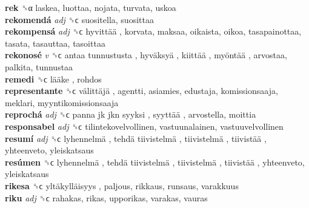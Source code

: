 \textbf{rek} ␝α  laskea, luottaa, nojata, turvata, uskoa  \\
\textbf{rekomendá} \emph{adj}  ␝ϲ  suositella, suosittaa  \\
\textbf{rekompensá} \emph{adj}  ␝ϲ   hyvittää , korvata, maksaa, oikaista, oikoa, tasapainottaa, tasata, tasauttaa, tasoittaa  \\
\textbf{rekonosé} \emph{v}  ␝ϲ   antaa tunnustusta ,  hyväksyä ,  kiittää ,  myöntää , arvostaa, palkita, tunnustaa  \\
\textbf{remedi} ␝ϲ   lääke , rohdos  \\
\textbf{representante} ␝ϲ   välittäjä , agentti, asiamies, edustaja, komissionsaaja, meklari, myyntikomissionsaaja  \\
\textbf{reprochá} \emph{adj}  ␝ϲ   panna jk jkn syyksi ,  syyttää , arvostella, moittia  \\
\textbf{responsabel} \emph{adj}  ␝ϲ  tilintekovelvollinen, vastuunalainen, vastuuvelvollinen  \\
\textbf{resumí} \emph{adj}  ␝ϲ   lyhennelmä ,  tehdä tiivistelmä ,  tiivistelmä ,  tiivistää , yhteenveto, yleiskatsaus  \\
\textbf{resúmen} ␝ϲ   lyhennelmä ,  tehdä tiivistelmä ,  tiivistelmä ,  tiivistää , yhteenveto, yleiskatsaus  \\
\textbf{rikesa} ␝ϲ   yltäkylläisyys , paljous, rikkaus, runsaus, varakkuus  \\
\textbf{riku} \emph{adj}  ␝ϲ  rahakas, rikas, upporikas, varakas, vauras  \\
